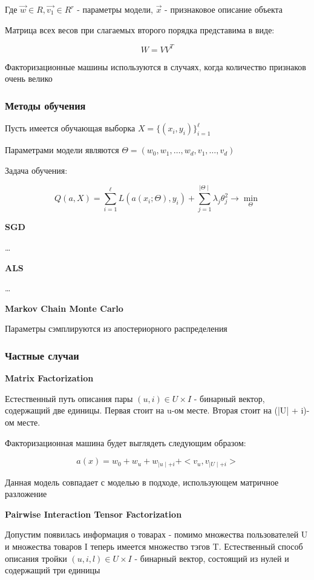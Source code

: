 \documentclass[a4paper, 12pt]{article}
\begin{document}
Где $\vec{w} \in R, \vec{v_1} \in R^r$ - параметры модели,
$\vec{x}$ - признаковое описание объекта

Матрица всех весов при слагаемых второго порядка представима в виде:

\[W = VV^T\]

Факторизационные машины используются в случаях,
когда количество признаков очень велико

\subsubsection{Методы обучения}

Пусть имеется обучающая выборка $X = \{(x_i, y_i)\}_{i = 1}^{\ell}$

Параметрами модели являются \(\Theta = (w_0, w_1, \dots, w_d, v_1, 
\dots, v_d)\)

Задача обучения:

\[Q(a, X) = \sum_{i = 1}^{\ell}L(a(x_i; \Theta), y_i)
+ \sum_{j = 1}^{\mid \Theta \mid} \lambda_j \theta_j^2 
\rightarrow \min_{\Theta}\]

\textbf{SGD}

\dots

\textbf{ALS}

\dots

\textbf{Markov Chain Monte Carlo}

Параметры сэмплируются из апостериорного распределения

\subsubsection{Частные случаи}

\textbf{Matrix Factorization}

Естественный путь описания пары $(u, i) \in U \times I$ -
бинарный вектор, содержащий две единицы. Первая стоит на
u-ом месте. Вторая стоит на (|U| + i)-ом месте.

Факторизационная машина будет выглядеть следующим образом:

\[a(x) = w_0 + w_u + w_{\mid u \mid + i} + 
<v_u, v_{\mid U \mid + i}>\]

Данная модель совпадает с моделью в подходе, 
использующем матричное разложение

\textbf{Pairwise Interaction Tensor Factorization}

Допустим появилась информация о товарах
- помимо множества пользователей U и 
множества товаров I теперь имеется множество тэгов
T. Естественный способ описания тройки $(u, i, l) \in U \times I$ -
бинарный вектор, состоящий из нулей и содержащий три единицы
\end{document}
